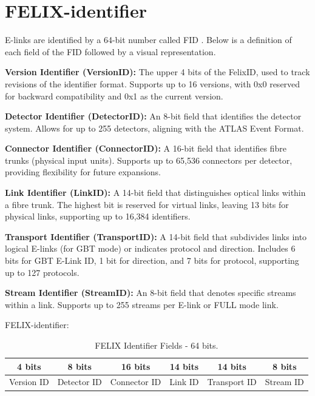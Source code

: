 \clearpage
\section{FELIX-identifier}
\label{sec:felix_identifier}

\acs{E-link}s are identified by a 64-bit number called \ac{FID} \cite{fid}. Below is a definition of each field of the \acs{FID} followed by a visual representation.

\textbf{Version Identifier (VersionID):} The upper 4 bits of the FelixID, used to track revisions of the identifier format. Supports up to 16 versions, with 0x0 reserved for backward compatibility and 0x1 as the current version.

\textbf{Detector Identifier (DetectorID):} An 8-bit field that identifies the detector system. Allows for up to 255 detectors, aligning with the ATLAS Event Format.

\textbf{Connector Identifier (ConnectorID):} A 16-bit field that identifies fibre trunks (physical input units). Supports up to 65,536 connectors per detector, providing flexibility for future expansions.

\textbf{Link Identifier (LinkID):} A 14-bit field that distinguishes optical links within a fibre trunk. The highest bit is reserved for virtual links, leaving 13 bits for physical links, supporting up to 16,384 identifiers.

\textbf{Transport Identifier (TransportID):} A 14-bit field that subdivides links into logical E-links (for GBT mode) or indicates protocol and direction. Includes 6 bits for GBT E-Link ID, 1 bit for direction, and 7 bits for protocol, supporting up to 127 protocols.

\textbf{Stream Identifier (StreamID):} An 8-bit field that denotes specific streams within a link. Supports up to 255 streams per E-link or FULL mode link.


\begin{definition}
\label{def:FID}
\acs{FELIX}-identifier:

\begin{table}[htbp]
\centering
\caption[FELIX Identifier Fields - 64 bits]{FELIX Identifier Fields - 64 bits.\label{lst:felix_identifier}}
\begin{tabular}{|c|c|c|c|c|c|}
\hline
4 bits & 8 bits & 16 bits & 14 bits & 14 bits & 8 bits \\ \hline
Version ID & Detector ID & Connector ID & Link ID & Transport ID & Stream ID \\ \hline
\end{tabular}
\end{table}

\end{definition}

